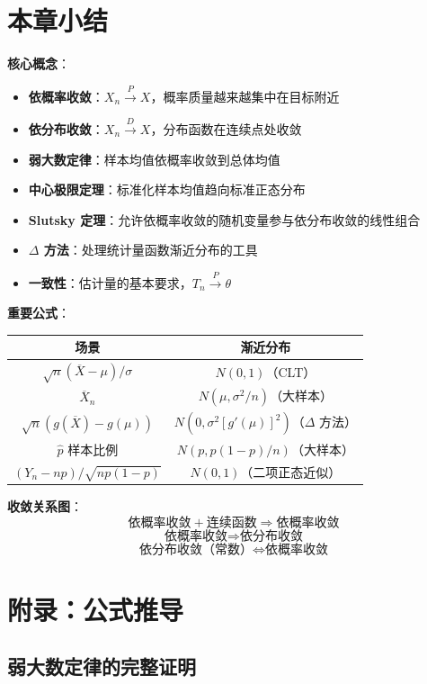 \section*{本章小结}

\textbf{核心概念}：
\begin{itemize}
\item \textbf{依概率收敛}：$X_n \xrightarrow{P} X$，概率质量越来越集中在目标附近
\item \textbf{依分布收敛}：$X_n \xrightarrow{D} X$，分布函数在连续点处收敛
\item \textbf{弱大数定律}：样本均值依概率收敛到总体均值
\item \textbf{中心极限定理}：标准化样本均值趋向标准正态分布
\item \textbf{Slutsky 定理}：允许依概率收敛的随机变量参与依分布收敛的线性组合
\item \textbf{$\Delta$ 方法}：处理统计量函数渐近分布的工具
\item \textbf{一致性}：估计量的基本要求，$T_n \xrightarrow{P} \theta$
\end{itemize}

\textbf{重要公式}：
\begin{center}
\begin{tabular}{|c|c|}
\hline
\textbf{场景} & \textbf{渐近分布} \\ \hline
$\sqrt{n}(\overline{X} - \mu)/\sigma$ & $N(0,1)$（CLT）\\ \hline
$\overline{X}_n$ & $N(\mu, \sigma^2/n)$（大样本）\\ \hline
$\sqrt{n}(g(\overline{X}) - g(\mu))$ & $N(0, \sigma^2[g'(\mu)]^2)$（$\Delta$ 方法）\\ \hline
$\widehat{p}$ 样本比例 & $N(p, p(1-p)/n)$（大样本）\\ \hline
$(Y_n - np)/\sqrt{np(1-p)}$ & $N(0,1)$（二项正态近似）\\ \hline
\end{tabular}
\end{center}

\textbf{收敛关系图}：
\[
\text{依概率收敛} + \text{连续函数} \Rightarrow \text{依概率收敛}
\]
\[
\text{依概率收敛} \Rightarrow \text{依分布收敛}
\]
\[
\text{依分布收敛（常数）} \Leftrightarrow \text{依概率收敛}
\]

\section{附录：公式推导}\label{sec:appendix-ch5}

\subsection{弱大数定律的完整证明}\label{sec:wlln-proof}

